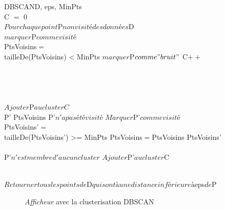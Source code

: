 \documentclass[12pt]{report}
\begin{document}
\begin{pseudocode}{DBSCAN}{D, eps, MinPts}
\\
C $=$ 0\\
$Pour chaque point $P$ non visité des données $D\\
$marquer $P$ comme visité$\\
PtsVoisins$ = $\\
\IF tailleDe(PtsVoisins) < MinPts
\THEN $marquer $P$ comme "bruit"$
\ELSE 
	\BEGIN
		C$++$\\
		\\
	\END\\
\\

\\
	$Ajouter $P$ au cluster C$\\
	\FOREACH P' \in PtsVoisins \DO
			\IF P'$ n'a pas été visité$
			\THEN 
				\BEGIN
					$Marquer $P'$ comme visité$\\
					PtsVoisins'$ = $ \\
					\IF tailleDe(PtsVoisins') >= MinPts
					\THEN PtsVoisins$ = $PtsVoisins \cup PtsVoisins'\\
				\END\\
			\IF P'$ n'est membre d'aucun cluster$
			\THEN $Ajouter $P'$ au cluster $C
\ENDPROCEDURE

\\
	$Retourner tous les points de $D$ qui sont à une distance inférieure à $eps$ de $P
\ENDPROCEDURE
\end{pseudocode}

\begin{figure}[h]
\begin{center}
\end{center}
\caption{\textit{Afficheur} avec la clusterisation DBSCAN}
\end{figure}
\end{document}
